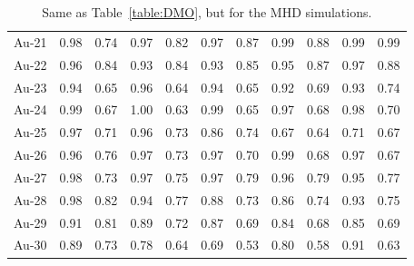 \documentclass[usenatbib]{mnras}
\begin{document}
\begin{table}
\begin{tabular}{c c c c c c c c c c c}
Au-21 & 0.98 & 0.74 & 0.97 & 0.82 & 0.97 & 0.87 & 0.99 & 0.88 & 0.99 & 0.99\\
Au-22 & 0.96 & 0.84 & 0.93 & 0.84 & 0.93 & 0.85 & 0.95 & 0.87 & 0.97 & 0.88\\
Au-23 & 0.94 & 0.65 & 0.96 & 0.64 & 0.94 & 0.65 & 0.92 & 0.69 & 0.93 & 0.74\\
Au-24 & 0.99 & 0.67 & 1.00 & 0.63 & 0.99 & 0.65 & 0.97 & 0.68 & 0.98 & 0.70\\
Au-25 & 0.97 & 0.71 & 0.96 & 0.73 & 0.86 & 0.74 & 0.67 & 0.64 & 0.71 & 0.67\\
Au-26 & 0.96 & 0.76 & 0.97 & 0.73 & 0.97 & 0.70 & 0.99 & 0.68 & 0.97 & 0.67\\
Au-27 & 0.98 & 0.73 & 0.97 & 0.75 & 0.97 & 0.79 & 0.96 & 0.79 & 0.95 & 0.77\\
Au-28 & 0.98 & 0.82 & 0.94 & 0.77 & 0.88 & 0.73 & 0.86 & 0.74 & 0.93 & 0.75\\
Au-29 & 0.91 & 0.81 & 0.89 & 0.72 & 0.87 & 0.69 & 0.84 & 0.68 & 0.85 & 0.69\\
Au-30 & 0.89 & 0.73 & 0.78 & 0.64 & 0.69 & 0.53 & 0.80 & 0.58 & 0.91 & 0.63\\
  \hline\hline
  \end{tabular}
  \caption{Same as Table~\ref{table:DMO}, but for the MHD simulations.   \label{table:MHD}}
\end{table}
\end{document}
